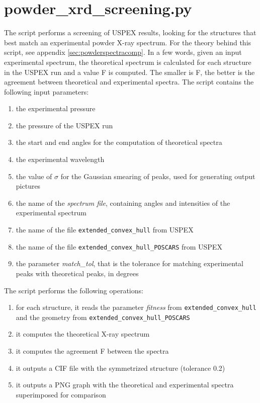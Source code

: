 \documentclass{article}
\begin{document}
\section{powder\_xrd\_screening.py}
The script performs a screening of USPEX results, looking for the structures that best match an experimental powder X-ray spectrum. For the theory behind this script, see appendix \ref{sec:powderspectracomp}. In a few words, given an input experimental spectrum, the theoretical spectrum is calculated for each structure in the USPEX run and a value F is computed. The smaller is F, the better is the agreement between theoretical and experimental spectra. The script contains the following input parameters:
\begin{enumerate}
	\item the experimental pressure
	\item the pressure of the USPEX run
	\item the start and end angles for the computation of theoretical spectra
	\item the experimental wavelength
	\item the value of $\sigma$ for the Gaussian smearing of peaks, used for generating output pictures
	\item the name of the \emph{spectrum file}, containing angles and intensities of the experimental spectrum
	\item the name of the file \texttt{extended\_convex\_hull} from USPEX
	\item the name of the file \texttt{extended\_convex\_hull\_POSCARS} from USPEX
	\item the parameter \emph{match\_tol}, that is the tolerance for matching experimental peaks with theoretical peaks, in degrees
\end{enumerate}
The script performs the following operations:
\begin{enumerate}
	\item for each structure, it reads the parameter \emph{fitness} from \texttt{extended\_convex\_hull} and the geometry from \texttt{extended\_convex\_hull\_POSCARS}
	\item it computes the theoretical X-ray spectrum
	\item it computes the agreement F between the spectra
	\item it outputs a CIF file with the symmetrized structure (tolerance 0.2)
	\item it outputs a PNG graph with the theoretical and experimental spectra superimposed for comparison
\end{enumerate}
\end{document}
